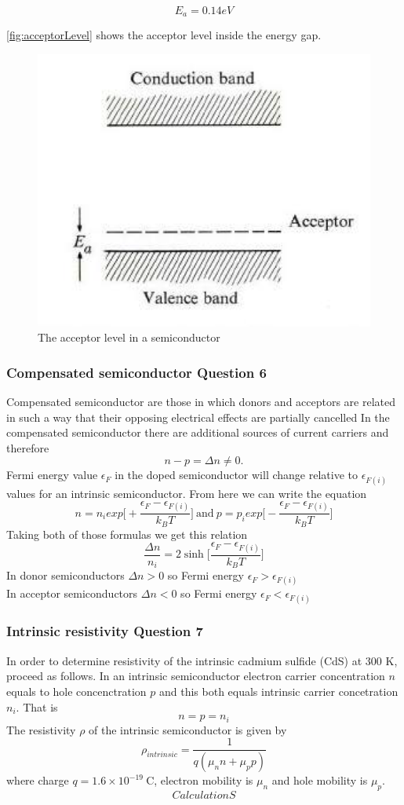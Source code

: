 $$E_a =  0.14eV$$

\autoref{fig:acceptorLevel} shows the acceptor level inside the energy gap.

\begin{figure}[H]
  \centering
  \includegraphics[width=0.35\linewidth]{Graphics/Chapter3/acceptorLevel.png}
  \caption{The acceptor level in a semiconductor \cite[Elementary Solid State Physics p. 268]{elementary_SSP} }
  \label{fig:acceptorLevel}
\end{figure}

\subsubsection*{Compensated semiconductor Question 6}

Compensated semiconductor are those in which donors and acceptors are related in such a way that their opposing electrical effects are partially cancelled
In the compensated semiconductor there are additional sources of current carriers and therefore
$$
n - p = \Delta n \neq 0.
$$
Fermi energy value $\epsilon_F$ in the doped semiconductor will change relative to $\epsilon_{F(i)}$ values for an intrinsic semiconductor. From here we can write the equation
$$
n = n_i exp\bigg[+\frac{\epsilon_F - \epsilon_{F(i)}}{k_B T}\bigg] \ \mathrm{and} \
p = p_i exp\bigg[-\frac{\epsilon_F - \epsilon_{F(i)}}{k_B T}\bigg]
$$
Taking both of those formulas we get this relation
\begin{equation}
\frac{\Delta n}{n_i} = 2\sinh{\bigg[\frac{\epsilon_F - \epsilon_{F(i)}}{k_B T}\bigg]}
\end{equation}
In donor semiconductors $\Delta n > 0$ so Fermi energy $\epsilon_F > \epsilon_{F(i)}$ \\
In acceptor semiconductors $\Delta n < 0$ so Fermi energy $\epsilon_F < \epsilon_{F(i)}$

\subsubsection*{Intrinsic resistivity Question 7}
In order to determine resistivity of the intrinsic cadmium sulfide (CdS) at 300 K, proceed as follows. In an intrinsic semiconductor electron carrier concentration $n$ equals to hole concenctration $p$ and this both equals intrinsic carrier concetration $n_i$. That is
$$
n = p = n_i 
$$
The resistivity $\rho$ of the intrinsic semiconductor is given by
$$
\rho_{intrinsic} = \frac{1}{q(\mu_nn + \mu_pp)}
$$
where charge $q = 1.6 \times 10^{-19}\ \mathrm{C}$, electron mobility is $\mu_n$ and hole mobility is $\mu_p$.
\begin{equation}
CalculationS
\end{equation}

